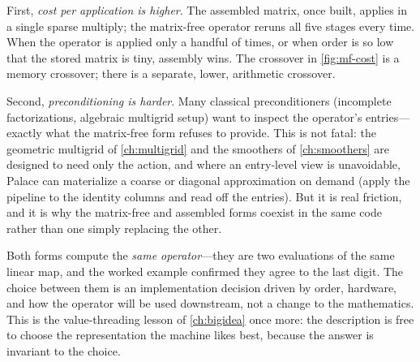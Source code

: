 First, \emph{cost per application is higher}. The assembled matrix, once built,
applies in a single sparse multiply; the matrix-free operator reruns all five
stages every time. When the operator is applied only a handful of times, or when
order is so low that the stored matrix is tiny, assembly wins. The crossover in
\cref{fig:mf-cost} is a memory crossover; there is a separate, lower, arithmetic
crossover.

Second, \emph{preconditioning is harder}. Many classical preconditioners
(incomplete factorizations, algebraic multigrid setup) want to inspect the
operator's entries---exactly what the matrix-free form refuses to provide. This is
not fatal: the geometric multigrid of \cref{ch:multigrid} and the smoothers of
\cref{ch:smoothers} are designed to need only the action, and where an entry-level
view is unavoidable, Palace can materialize a coarse or diagonal approximation on
demand (apply the pipeline to the identity columns and read off the entries). But
it is real friction, and it is why the matrix-free and assembled forms coexist in
the same code rather than one simply replacing the other.

\begin{remark}
Both forms compute the \emph{same operator}---they are two evaluations of the same
linear map, and the worked example confirmed they agree to the last digit. The
choice between them is an implementation decision driven by order, hardware, and
how the operator will be used downstream, not a change to the mathematics. This is
the value-threading lesson of \cref{ch:bigidea} once more: the description is free
to choose the representation the machine likes best, because the answer is
invariant to the choice.
\end{remark}

